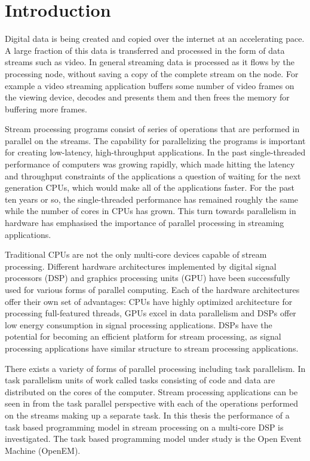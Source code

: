 \chapter{Introduction}
\label{chapter:introduction}
Digital data is being created and copied over the internet at an accelerating pace. A large fraction of this data is transferred and processed in the form of data streams such as video. In general streaming data is processed as it flows by the processing node, without saving a copy of the complete stream on the node. For example a video streaming application buffers some number of video frames on the viewing device, decodes and presents them and then frees the memory for buffering more frames.

Stream processing programs consist of series of operations that are performed in parallel on the streams. The capability for parallelizing the programs is important for creating low-latency, high-throughput applications. In the past single-threaded performance of computers was growing rapidly, which made hitting the latency and throughput constraints of the applications a question of waiting for the next generation CPUs, which would make all of the applications faster. For the past ten years or so, the single-threaded performance has remained roughly the same while the number of cores in CPUs has grown. This turn towards parallelism in hardware has emphasised the importance of parallel processing in streaming applications.

Traditional CPUs are not the only multi-core devices capable of stream processing. Different hardware architectures implemented by digital signal processors (DSP) and graphics processing units (GPU) have been successfully used for various forms of parallel computing. Each of the hardware architectures offer their own set of advantages: CPUs have highly optimized architecture for processing full-featured threads, GPUs excel in data parallelism and DSPs offer low energy consumption in signal processing applications. DSPs have the potential for becoming an efficient platform for stream processing, as signal processing applications have similar structure to stream processing applications.

There exists a variety of forms of parallel processing including task parallelism. In task parallelism units of work called tasks consisting of code and data are distributed on the cores of the computer. Stream processing applications can be seen in from the task parallel perspective with each of the operations performed on the streams making up a separate task. In this thesis the performance of a task based programming model in stream processing on a multi-core DSP is investigated. The task based programming model under study is the Open Event Machine (OpenEM).

